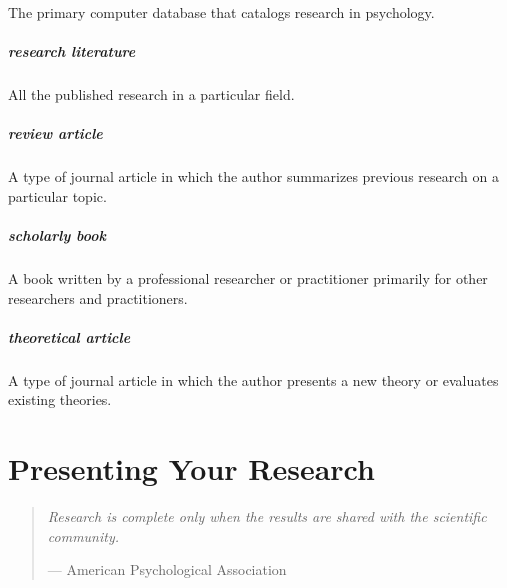 \documentclass[
]{krantz}
\begin{document}
The primary computer database that catalogs research in psychology.

\hypertarget{research-literature}{%
\paragraph*{research literature}\label{research-literature}}

All the published research in a particular field.

\hypertarget{review-article}{%
\paragraph*{review article}\label{review-article}}

A type of journal article in which the author summarizes previous research on a particular topic.

\hypertarget{scholarly-book}{%
\paragraph*{scholarly book}\label{scholarly-book}}

A book written by a professional researcher or practitioner primarily for other researchers and practitioners.

\hypertarget{theoretical-article}{%
\paragraph*{theoretical article}\label{theoretical-article}}

A type of journal article in which the author presents a new theory or evaluates existing theories.

\hypertarget{presenting-your-research}{%
\chapter{Presenting Your Research}\label{presenting-your-research}}

\begin{quote}
\emph{Research is complete only when the results are shared with the scientific community.}

--- American Psychological Association
\end{quote}
\end{document}
